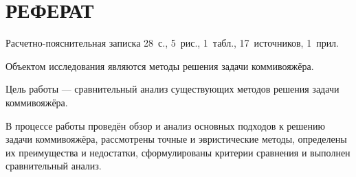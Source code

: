 \chapter*{РЕФЕРАТ}

Расчетно-пояснительная записка 28~с., 5~рис., 1~табл., 17~источников, 1~прил.

Объектом исследования являются методы решения задачи коммивояжёра.

Цель работы — сравнительный анализ существующих методов решения задачи коммивояжёра.

В процессе работы проведён обзор и анализ основных подходов к решению задачи коммивояжёра, рассмотрены точные и эвристические методы, определены их преимущества и недостатки, сформулированы критерии сравнения и выполнен сравнительный анализ.

\setcounter{page}{3}